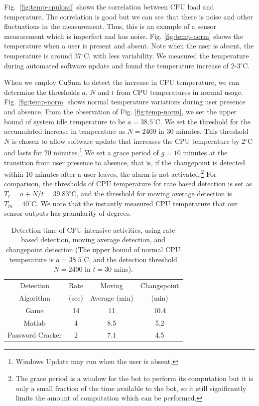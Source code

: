 Fig.~\ref{fig:temp-cpuload} shows the correlation between CPU load
and temperature.
The correlation is good but we can see that there is
noise and other fluctuations in the measurement.
Thus, this is an example of a sensor measurement which is imperfect and
has noise.
Fig. \ref{fig:temp-norm} shows the temperature when a user
is present and absent. Note when the user is absent, the temperature
is around 37$^\circ$C, with less variability.  We measured the
temperature during automated software update and found the
temperature increase of 2-3$^\circ$C.

When we employ CuSum to detect the increase in CPU temperature, we can determine the thresholds $a$, $N$ and $t$ from CPU temperatures in normal usage. Fig.
\ref{fig:temp-norm} shows normal temperature variations during user
presence and absence. From the observation of Fig.
\ref{fig:temp-norm}, we set the upper bound of system idle
temperature to be $a=38.5^\circ$C. We set the threshold for
the accumulated increase in temperature as $N=2400$ in 30 minutes.
This threshold $N$ is chosen to allow software update that increases
the CPU temperature by 2$^\circ$C and lasts for 20 minutes.\footnote{
Windows Update may run when the user is absent.
}
We set a grace period of $g=10$ minutes at the transition
from user presence to absence, that is, if the changepoint is
detected within 10 minutes after a user leaves, the alarm is not
activated.\footnote{
The grace period is a window for the bot to perform its computation but
it is only a small fraction of the time available to the bot, so it still
significantly limits the amount of computation which can be performed.
}
For comparison, the thresholds of CPU temperature for rate based detection is set as $T_r = a + N/t = 39.83^\circ$C, and the threshold for moving average detection is $T_m = 40^\circ$C. We note that the instantly measured CPU temperature that our sensor outputs has granularity of degrees.

\begin{table}[tb]
\centering
\begin{tabular}{|c|c|c|c|}
\hline
Detection & Rate & Moving & Changepoint \\
Algorithm & (sec) & Average (min) & (min) \\
\hline
Game            & 14 & 11  & 10.4   \\
\hline
Matlab           & 4 & 8.5 & 5.2   \\
\hline
Password Cracker & 2 & 7.1 & 4.5   \\ [0.5ex]
\hline
\end{tabular}
\caption{Detection time of CPU intensive activities,
using rate based detection, moving average detection,
and changepoint detection (The upper bound of normal CPU temperature
is $a=38.5^\circ$C,
and the detection threshold $N=2400$ in $t=30$ mins).}
\label{tbl:detect-CPU}
\end{table}

